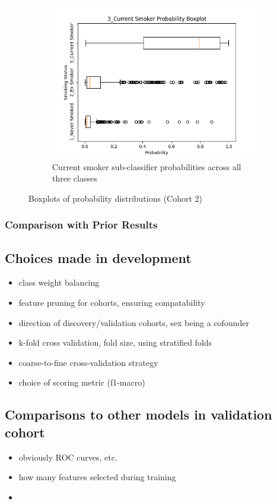 \documentclass{article}
\begin{document}
\begin{figure}
    \begin{subfigure}{0.48\textwidth}
        \centering
        \includegraphics[width=\linewidth]{cohort2_3_boxplot.png}
        \caption{Current smoker sub-classifier probabilities across all three classes}
    \end{subfigure}
    \caption{Boxplots of probability distributions (Cohort 2)}
\end{figure}

\subsubsection{Comparison with Prior Results}


\subsection*{Choices made in development}
\begin{itemize}
    \item class weight balancing
    \item feature pruning for cohorts, ensuring compatability
    \item direction of discovery/validation cohorts, sex being a cofounder
    \item k-fold cross validation, fold size, using stratified folds
    \item coarse-to-fine cross-validation strategy
    \item choice of scoring metric (f1-macro)
\end{itemize}

\subsection*{Comparisons to other models in validation cohort}
\begin{itemize}
    \item obviously ROC curves, etc.
    \item how many features selected during training
    \item
\end{itemize}
\end{document}
